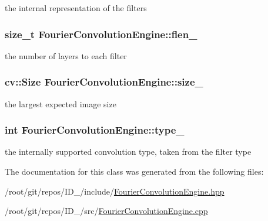 the internal representation of the filters 

\hypertarget{classFourierConvolutionEngine_ab4322f51ce4a18ab5b7439abb5c96aef}{
\subsubsection[{flen\-\_\-}]{\setlength{\rightskip}{0pt plus 5cm}size\-\_\-t {\bf \-Fourier\-Convolution\-Engine\-::flen\-\_\-}}}\label{classFourierConvolutionEngine_ab4322f51ce4a18ab5b7439abb5c96aef}


the number of layers to each filter 

\hypertarget{classFourierConvolutionEngine_a2375ea1729ad2fe45fe6204130f3f39f}{
\subsubsection[{size\-\_\-}]{\setlength{\rightskip}{0pt plus 5cm}cv\-::\-Size {\bf \-Fourier\-Convolution\-Engine\-::size\-\_\-}}}\label{classFourierConvolutionEngine_a2375ea1729ad2fe45fe6204130f3f39f}


the largest expected image size 

\hypertarget{classFourierConvolutionEngine_a3e213d98d690b295eaa2866618f17933}{
\subsubsection[{type\-\_\-}]{\setlength{\rightskip}{0pt plus 5cm}int {\bf \-Fourier\-Convolution\-Engine\-::type\-\_\-}}}\label{classFourierConvolutionEngine_a3e213d98d690b295eaa2866618f17933}


the internally supported convolution type, taken from the filter type 



\-The documentation for this class was generated from the following files\-:\begin{DoxyCompactItemize}
\item 
/root/git/repos/\-I\-D\-\_/include/\hyperlink{FourierConvolutionEngine_8hpp}{\-Fourier\-Convolution\-Engine.\-hpp}\item 
/root/git/repos/\-I\-D\-\_/src/\hyperlink{FourierConvolutionEngine_8cpp}{\-Fourier\-Convolution\-Engine.\-cpp}\end{DoxyCompactItemize}
